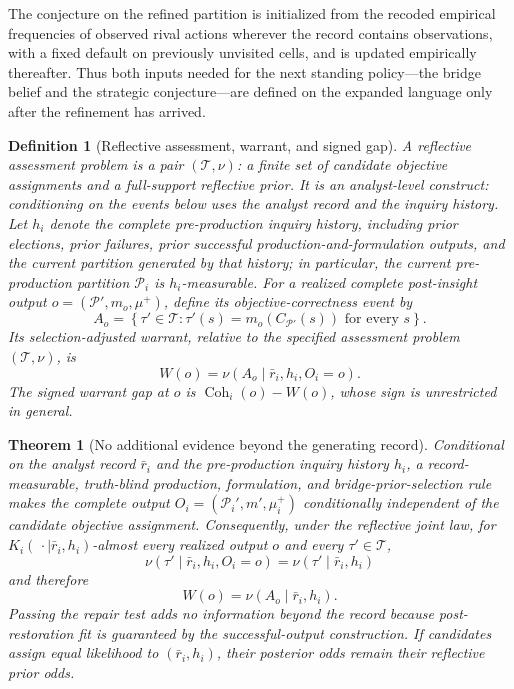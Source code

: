 \documentclass[11pt]{article}
\newtheorem{definition}[assumption]{Definition}
\newtheorem{theorem}[assumption]{Theorem}
\theoremstyle{definition}
\begin{document}
The conjecture on the refined partition is initialized from the recoded empirical frequencies of observed rival actions wherever the record contains observations, with a fixed default on previously unvisited cells, and is updated empirically thereafter.
Thus both inputs needed for the next standing policy---the bridge belief and the strategic conjecture---are defined on the expanded language only after the refinement has arrived.

\begin{definition}[Reflective assessment, warrant, and signed gap]
\label{def:warrant}
A reflective assessment problem is a pair $(\mathcal T,\nu)$: a finite set of candidate objective assignments and a full-support reflective prior.
It is an \emph{analyst-level} construct: conditioning on the events below uses the analyst record and the inquiry history.
Let $h_i$ denote the complete pre-production inquiry history, including prior elections, prior failures, prior successful production-and-formulation outputs, and the current partition generated by that history; in particular, the current pre-production partition $\mathcal P_i$ is $h_i$-measurable.
For a realized complete post-insight output $o=(\mathcal P',m_o,\mu^+)$, define its objective-correctness event by
\[
A_o
=
\left\{
\tau'\in\mathcal T:
\tau'(s)=m_o(C_{\mathcal P'}(s))
\text{ for every }s
\right\}.
\]
Its \emph{selection-adjusted warrant}, relative to the specified assessment problem $(\mathcal T,\nu)$, is
\[
W(o)
=
\nu(A_o\mid\bar r_i,h_i,O_i=o).
\]
The \emph{signed warrant gap} at $o$ is $\operatorname{Coh}_i(o)-W(o)$, whose sign is unrestricted in general.
\end{definition}

\begin{theorem}[No additional evidence beyond the generating record]
\label{thm:uninformative}
Conditional on the analyst record $\bar r_i$ and the pre-production inquiry history $h_i$, a record-measurable, truth-blind production, formulation, and bridge-prior-selection rule makes the complete output $O_i=(\mathcal P_i',m',\mu_i^+)$ conditionally independent of the candidate objective assignment.
Consequently, under the reflective joint law, for $K_i(\,\cdot\mid\bar r_i,h_i)$-almost every realized output $o$ and every $\tau'\in\mathcal T$,
\[
\nu(\tau'\mid\bar r_i,h_i,O_i=o)
=
\nu(\tau'\mid\bar r_i,h_i)
\]
and therefore
\[
W(o)
=
\nu(A_o\mid\bar r_i,h_i).
\]
Passing the repair test adds no information beyond the record because post-restoration fit is guaranteed by the successful-output construction.
If candidates assign equal likelihood to $(\bar r_i,h_i)$, their posterior odds remain their reflective prior odds.
\end{theorem}
\end{document}
